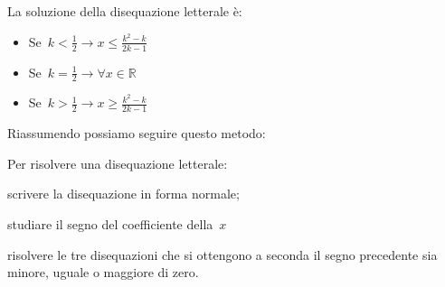La soluzione della disequazione letterale è:

\begin{itemize} [noitemsep]
 \item Se~$k < \frac{1}{2} \rightarrow x \le \frac{k^2 - k}{2 k - 1}$
 \item Se~$k = \frac{1}{2} \rightarrow \forall x \in \mathbb{R}$
 \item Se~$k > \frac{1}{2} \rightarrow x \ge \frac{k^2 - k}{2 k - 1}$
\end{itemize}

Riassumendo possiamo seguire questo metodo:

\begin{procedura}
 Per risolvere una disequazione letterale:
\begin{enumeratea}
 \item scrivere la disequazione in forma normale;
 \item studiare il segno del coefficiente della~$x$
 \item risolvere le tre disequazioni che si ottengono a seconda il segno 
  precedente sia minore, uguale o maggiore di zero.
\end{enumeratea}
\end{procedura}






